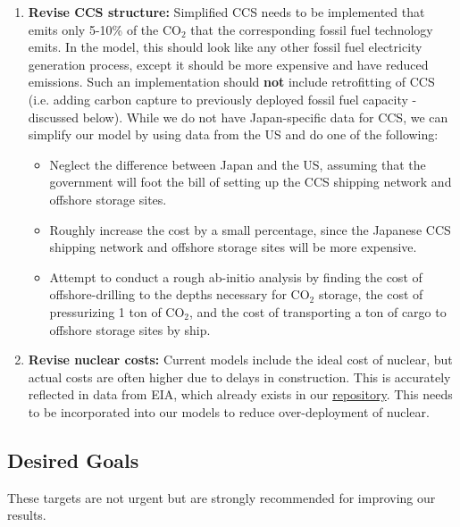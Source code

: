 \documentclass[14pt,a4paper]{article} %
\begin{document}
\begin{enumerate}
\item \textbf{Revise CCS structure:} Simplified CCS needs to be implemented that emits only 5-10\% of the CO$_2$ that the corresponding fossil fuel technology emits. In the model, this should look like any other fossil fuel electricity generation process, except it should be more expensive and have reduced emissions. Such an implementation should \textbf{not} include retrofitting of CCS (i.e. adding carbon capture to previously deployed fossil fuel capacity - discussed below). While we do not have Japan-specific data for CCS, we can simplify our model by using data from the US and do one of the following:
\begin{itemize}

\item Neglect the difference between Japan and the US, assuming that the government will foot the bill of setting up the CCS shipping network and offshore storage sites.

\item Roughly increase the cost by a small percentage, since the Japanese CCS shipping network and offshore storage sites will be more expensive.

\item Attempt to conduct a rough ab-initio analysis by finding the cost of offshore-drilling to the depths necessary for CO$_2$ storage, the cost of pressurizing 1 ton of CO$_2$, and the cost of transporting a ton of cargo to offshore storage sites by ship.

\end{itemize}

\item \textbf{Revise nuclear costs:} Current models include the ideal cost of nuclear, but actual costs are often higher due to delays in construction. This is accurately reflected in data from EIA, which already exists in our \href{https://github.com/arfc/i2cner/tree/master/data/japan_costs/fossil-ccs-nuc.xlsx}{repository}. This needs to be incorporated into our models to reduce over-deployment of nuclear.

\end{enumerate}

\subsection{Desired Goals}
These targets are not urgent but are strongly recommended for improving our results.
\end{document}
